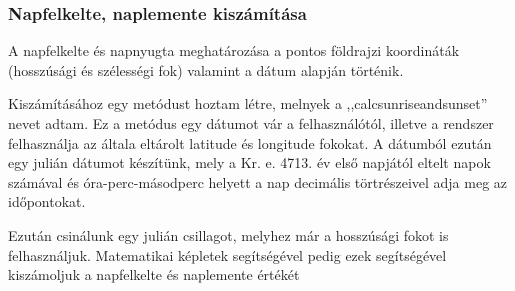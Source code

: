 \documentclass[
]{thesis-ekf}
\theoremstyle{definition}
\theoremstyle{remark}
\begin{document}
			\subsubsection{Napfelkelte, naplemente kiszámítása}
				\par A napfelkelte és napnyugta meghatározása a pontos földrajzi koordináták (hosszúsági és szélességi fok) valamint a dátum alapján történik.\cite{kiszamolo}
				\par Kiszámításához egy metódust hoztam létre, melnyek a  ,,calcsunriseandsunset'' nevet adtam. Ez a metódus egy dátumot vár a felhasználótól, illetve a rendszer felhasználja az általa eltárolt latitude és longitude fokokat. A dátumból ezután egy julián dátumot készítünk, mely a Kr. e. 4713. év első napjától eltelt napok számával és óra-perc-másodperc helyett a nap decimális törtrészeivel adja meg az időpontokat.\cite{julian}
				\par Ezután csinálunk egy julián csillagot, melyhez már a hosszúsági fokot is felhasználjuk. Matematikai képletek segítségével pedig ezek segítségével kiszámoljuk a napfelkelte és naplemente értékét

				
\end{document}
